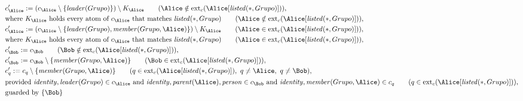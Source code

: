 \begin{align*}
&
c'_
{
\Alice
}
 := 
(c_
{
\Alice
}
 \setminus 
\{
\mathit{\detokenize{
leader
}}
(
Grupo
)
\}
) \setminus K_
{
\Alice
}
 \qquad (
\Alice
 \notin 
\mathrm{ext}_c(
\Alice
[
\mathit{\detokenize{
listed
}}
(
\ast
,
Grupo
)
]
)
)
,\\
&
\text{where } K_
{
\Alice
}
 \text{ holds every atom of } c_
{
\Alice
}
 \text{ that matches } 
\mathit{\detokenize{
listed
}}
(
\ast
,
Grupo
)
 \qquad (
\Alice
 \notin 
\mathrm{ext}_c(
\Alice
[
\mathit{\detokenize{
listed
}}
(
\ast
,
Grupo
)
]
)
)
,\\
&
c'_
{
\Alice
}
 := 
(c_
{
\Alice
}
 \setminus 
\{
\mathit{\detokenize{
leader
}}
(
Grupo
)
,
\mathit{\detokenize{
member
}}
(
Grupo
,
\Alice
)
\}
) \setminus K_
{
\Alice
}
 \qquad (
\Alice
 \in 
\mathrm{ext}_c(
\Alice
[
\mathit{\detokenize{
listed
}}
(
\ast
,
Grupo
)
]
)
)
,\\
&
\text{where } K_
{
\Alice
}
 \text{ holds every atom of } c_
{
\Alice
}
 \text{ that matches } 
\mathit{\detokenize{
listed
}}
(
\ast
,
Grupo
)
 \qquad (
\Alice
 \in 
\mathrm{ext}_c(
\Alice
[
\mathit{\detokenize{
listed
}}
(
\ast
,
Grupo
)
]
)
)
,\\
&
c'_
{
\Bob
}
 := 
c_
{
\Bob
}
 \qquad (
\Bob
 \notin 
\mathrm{ext}_c(
\Alice
[
\mathit{\detokenize{
listed
}}
(
\ast
,
Grupo
)
]
)
)
,\\
&
c'_
{
\Bob
}
 := 
c_
{
\Bob
}
 \setminus 
\{
\mathit{\detokenize{
member
}}
(
Grupo
,
\Alice
)
\}
 \qquad (
\Bob
 \in 
\mathrm{ext}_c(
\Alice
[
\mathit{\detokenize{
listed
}}
(
\ast
,
Grupo
)
]
)
)
,\\
&
c'_
q
 := 
c_
q
 \setminus 
\{
\mathit{\detokenize{
member
}}
(
Grupo
,
\Alice
)
\}
 \qquad (
q
 \in 
\mathrm{ext}_c(
\Alice
[
\mathit{\detokenize{
listed
}}
(
\ast
,
Grupo
)
]
)
,\ 
q \neq 
\Alice
,\ 
q \neq 
\Bob
)
,\\
&
\text{provided } 
\mathit{\detokenize{
identity
}}
,
\mathit{\detokenize{
leader
}}
(
Grupo
)
 \in c_
{
\Alice
}
 \text{ and } 
\mathit{\detokenize{
identity
}}
,
\mathit{\detokenize{
parent
}}
(
\Alice
)
,
\mathit{\detokenize{
person
}}
 \in c_
{
\Bob
}
 \text{ and } 
\mathit{\detokenize{
identity
}}
,
\mathit{\detokenize{
member
}}
(
Grupo
,
\Alice
)
 \in c_
q
 \qquad (
q \in 
\mathrm{ext}_c(
\Alice
[
\mathit{\detokenize{
listed
}}
(
\ast
,
Grupo
)
]
)
)
,\\
&
\text{guarded by } \{
\Bob
\}
\end{align*}

